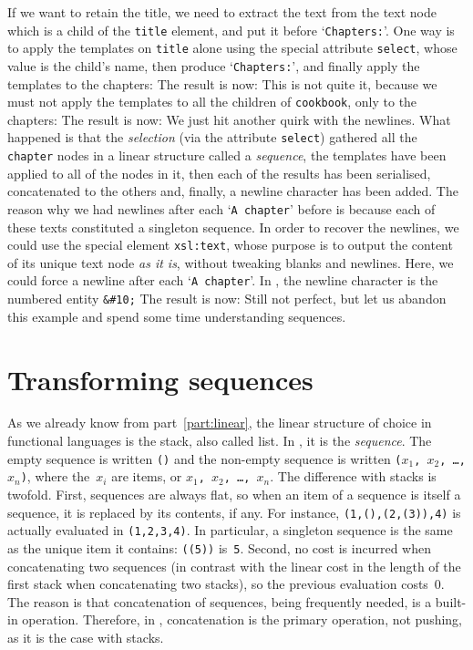 If we want to retain the title, we need to extract the text from the
text node which is a child of the \texttt{title} element, and put it
before `\texttt{Chapters:}'. One way is to apply the templates on
\texttt{title} alone using the special attribute \texttt{select},
whose value is the child's name, then produce `\texttt{Chapters:}',
and finally apply the templates to the chapters:
\noindent The result is now:
\noindent This is not quite it, because we must not apply the
templates to all the children of \texttt{cookbook}, only to the
chapters:
\noindent The result is now:
\noindent We just hit another quirk with the newlines. What happened
is that the \emph{selection} (via the attribute \texttt{select})
gathered all the \texttt{chapter} nodes in a linear structure called a
\emph{sequence}, the templates have been applied to all of the nodes
in it, then each of the results has been serialised, concatenated to the
others and, finally, a newline character has been added. The reason
why we had newlines after each `\texttt{A chapter}' before is because
each of these texts constituted a singleton sequence. In order to
recover the newlines, we could use the special element
\texttt{xsl:text}, whose purpose is to output the content of its
unique text node \emph{as it is}, without tweaking blanks and
newlines. Here, we could force a newline after each `\texttt{A
  chapter}'. In \XML, the newline character is the numbered entity
\verb|&#10;| 
\noindent The result is now:
\noindent Still not perfect, but let us abandon this example and spend
some time understanding sequences.

\section{Transforming sequences}

As we already know from part~\ref{part:linear}, the linear structure
of choice in functional languages is the stack, also called list. In
\XSLT, it is the \emph{sequence}. The empty sequence is written
\texttt{()} and the non-empty sequence is written \texttt{(\(x_1\),
  \(x_2\), \dots, \(x_n\))}, where the~\(x_i\) are items, or
\texttt{\(x_1\), \(x_2\), \dots, \(x_n\)}. The difference with stacks
is twofold. First, sequences are always flat, so when an item of a
sequence is itself a sequence, it is replaced by its contents, if
any. For instance, \texttt{(1,(),(2,(3)),4)} is actually evaluated in
\texttt{(1,2,3,4)}. In particular, a singleton sequence is the same as
the unique item it contains: \texttt{((5))} is~\texttt{5}. Second, no
cost is incurred when concatenating two sequences (in contrast with the
linear cost in the length of the first stack when concatenating two
stacks), so the previous evaluation costs~\(0\). The reason is that
concatenation of sequences, being frequently needed, is a built\hyp{}in
operation. Therefore, in \XSLT, concatenation is the primary operation,
not pushing, as it is the case with stacks.

